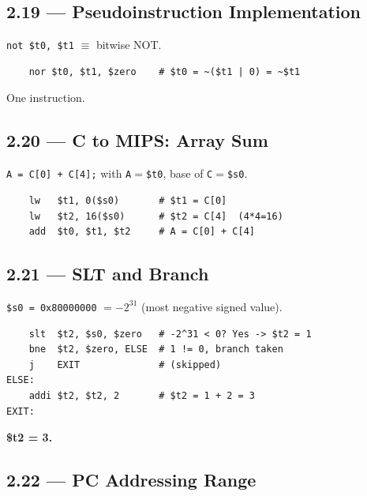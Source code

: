 \subsection*{2.19 --- Pseudoinstruction Implementation}
\hypertarget{sol-2.19}{}

\texttt{not \$t0, \$t1} $\equiv$ bitwise NOT.
\begin{verbatim}
    nor $t0, $t1, $zero    # $t0 = ~($t1 | 0) = ~$t1
\end{verbatim}
One instruction.

\subsection*{2.20 --- C to MIPS: Array Sum}
\hypertarget{sol-2.20}{}

\texttt{A = C[0] + C[4];}  with \texttt{A}$=$\texttt{\$t0},
base of \texttt{C}$=$\texttt{\$s0}.
\begin{verbatim}
    lw   $t1, 0($s0)       # $t1 = C[0]
    lw   $t2, 16($s0)      # $t2 = C[4]  (4*4=16)
    add  $t0, $t1, $t2     # A = C[0] + C[4]
\end{verbatim}

\subsection*{2.21 --- SLT and Branch}
\hypertarget{sol-2.21}{}

\texttt{\$s0 = 0x80000000} $= -2^{31}$ (most negative signed value).
\begin{verbatim}
    slt  $t2, $s0, $zero   # -2^31 < 0? Yes -> $t2 = 1
    bne  $t2, $zero, ELSE  # 1 != 0, branch taken
    j    EXIT              # (skipped)
ELSE:
    addi $t2, $t2, 2       # $t2 = 1 + 2 = 3
EXIT:
\end{verbatim}
\textbf{\$t2 = 3.}

\subsection*{2.22 --- PC Addressing Range}
\hypertarget{sol-2.22}{}

